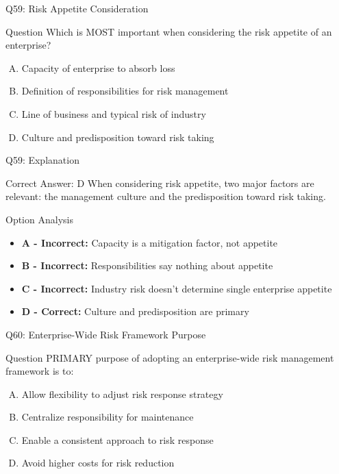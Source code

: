 \documentclass{beamer}
\begin{document}
	\begin{frame}{Q59: Risk Appetite Consideration}
		\begin{block}{Question}
			Which is MOST important when considering the risk appetite of an enterprise?
		\end{block}
		\begin{enumerate}[(A)]
			\item Capacity of enterprise to absorb loss
			\item Definition of responsibilities for risk management
			\item Line of business and typical risk of industry
			\item Culture and predisposition toward risk taking
		\end{enumerate}
	\end{frame}
	
	\begin{frame}{Q59: Explanation}
		\begin{block}{Correct Answer: D}
			When considering risk appetite, two major factors are relevant: the management culture and the predisposition toward risk taking.
		\end{block}
		\begin{block}{Option Analysis}
			\begin{itemize}
				\item \textbf{A - Incorrect:} Capacity is a mitigation factor, not appetite
				\item \textbf{B - Incorrect:} Responsibilities say nothing about appetite
				\item \textbf{C - Incorrect:} Industry risk doesn't determine single enterprise appetite
				\item \textbf{D - Correct:} Culture and predisposition are primary
			\end{itemize}
		\end{block}
	\end{frame}
	
	\begin{frame}{Q60: Enterprise-Wide Risk Framework Purpose}
		\begin{block}{Question}
			PRIMARY purpose of adopting an enterprise-wide risk management framework is to:
		\end{block}
		\begin{enumerate}[(A)]
			\item Allow flexibility to adjust risk response strategy
			\item Centralize responsibility for maintenance
			\item Enable a consistent approach to risk response
			\item Avoid higher costs for risk reduction
		\end{enumerate}
	\end{frame}
	
\end{document}
